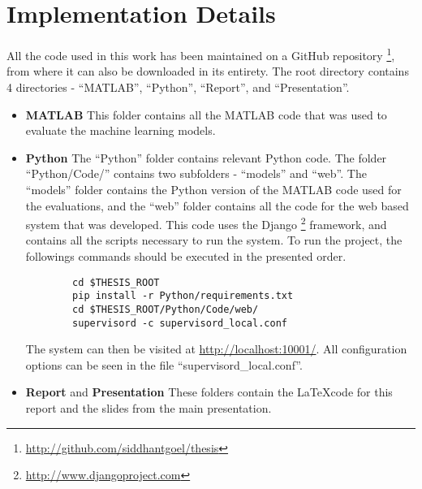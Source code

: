 \chapter{Implementation Details}
\label{chapter:Appendix}

All the code used in this work has been maintained on a GitHub repository \footnote{\url{http://github.com/siddhantgoel/thesis}}, from where it can also be downloaded in its entirety. The root directory contains 4 directories - ``MATLAB'', ``Python'', ``Report'', and ``Presentation''.

\begin{itemize}
    \item{\textbf{MATLAB} This folder contains all the MATLAB code that was used to evaluate the machine learning models.}
    \item{\textbf{Python} The ``Python'' folder contains relevant Python code. The folder ``Python/Code/'' contains two subfolders - ``models'' and ``web''. The ``models'' folder contains the Python version of the MATLAB code used for the evaluations, and the ``web'' folder contains all the code for the web based system that was developed. This code uses the Django \footnote{\url{http://www.djangoproject.com}} framework, and contains all the scripts necessary to run the system. To run the project, the followings commands should be executed in the presented order.
    \begin{verbatim}
        cd $THESIS_ROOT
        pip install -r Python/requirements.txt
        cd $THESIS_ROOT/Python/Code/web/
        supervisord -c supervisord_local.conf
    \end{verbatim}
    }
    The system can then be visited at \url{http://localhost:10001/}. All configuration options can be seen in the file ``supervisord\_local.conf''.
    \item{\textbf{Report} and \textbf{Presentation} These folders contain the \LaTeX code for this report and the slides from the main presentation.}
\end{itemize}

